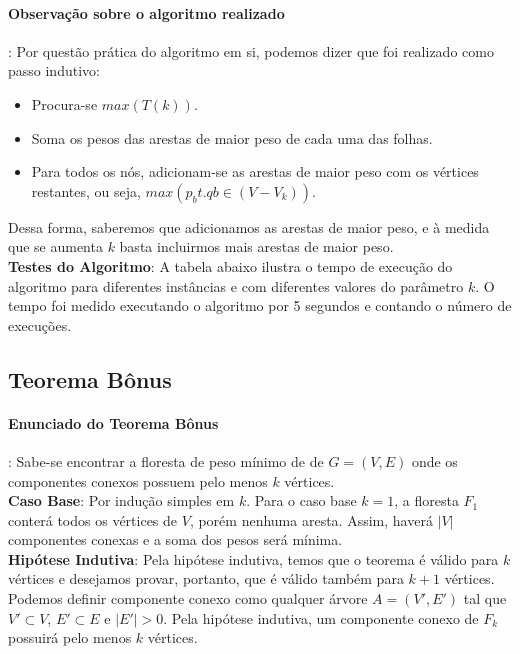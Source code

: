 \documentclass[paper=a4, fontsize=11pt]{scrartcl} %
\numberwithin{equation}{section} %
\numberwithin{figure}{section} %
\numberwithin{table}{section} %
\begin{document}
\paragraph{Observação sobre o algoritmo realizado}: Por questão prática do algoritmo em si, podemos dizer que foi realizado como passo indutivo:

\begin{itemize}
   \item Procura-se $max(T(k))$.
   \item Soma os pesos das arestas de maior peso de cada uma das folhas.
   \item Para todos os nós, adicionam-se as arestas de maior peso com os vértices restantes, ou seja, $max(p_b t.q b \in (V - V_k))$.
\end{itemize}

Dessa forma, saberemos que adicionamos as arestas de maior peso, e à medida que se aumenta $k$ basta incluirmos mais arestas de maior peso. \\

\textbf{Testes do Algoritmo}: A tabela abaixo ilustra o tempo de execução do algoritmo para diferentes instâncias e com diferentes valores do parâmetro $k$. O tempo foi medido executando o algoritmo por 5 segundos e contando o número de execuções.

%
%
%
%
%
%
%
%
%
%
%
%
%
%
%
%
%
%
%
%
%
%
%

\pagebreak


\subsection{Teorema Bônus}

\paragraph{Enunciado do Teorema Bônus}: Sabe-se encontrar a floresta de peso mínimo de de $G=(V,E)$ onde os componentes conexos possuem pelo menos $k$ vértices. \\

\textbf{Caso Base}: Por indução simples em $k$. Para o caso base $k = 1$, a floresta $F_1$ conterá todos os vértices de $V$, porém nenhuma aresta. Assim, haverá $|V|$ componentes conexas e a soma dos pesos será mínima. \\

\textbf{Hipótese Indutiva}: Pela hipótese indutiva, temos que o teorema é válido para $k$ vértices e desejamos provar, portanto, que é válido também para $k+1$ vértices. Podemos definir componente conexo como qualquer árvore $A=(V',E')$ tal que $V'\subset V$, $E'\subset E$ e $|E'|>0$. Pela hipótese indutiva, um componente conexo de $F_k$ possuirá pelo menos $k$ vértices. \\
\end{document}
